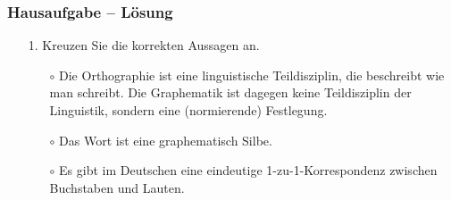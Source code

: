 
\begin{frame}%
\frametitle{Hausaufgabe -- Lösung}

\begin{itemize}
	
	\item[1.] Kreuzen Sie die korrekten Aussagen an.
	
	\begin{itemize}
		\item[$\circ$] Die Orthographie ist eine linguistische Teildisziplin, die beschreibt wie man schreibt. Die Graphematik ist dagegen keine Teildisziplin der Linguistik, sondern eine  (normierende) Festlegung.
		
		\item[\alertgreen{$\checkmark$}] 
		
		\item[$\circ$] Das Wort  ist eine graphematisch  Silbe.
		
		\item[$\circ$] Es gibt im Deutschen eine eindeutige 1-zu-1-Korrespondenz zwischen Buchstaben und Lauten.
		
		\item[\alertgreen{$\checkmark$}] 
	\end{itemize}
\end{itemize}
\end{frame}


